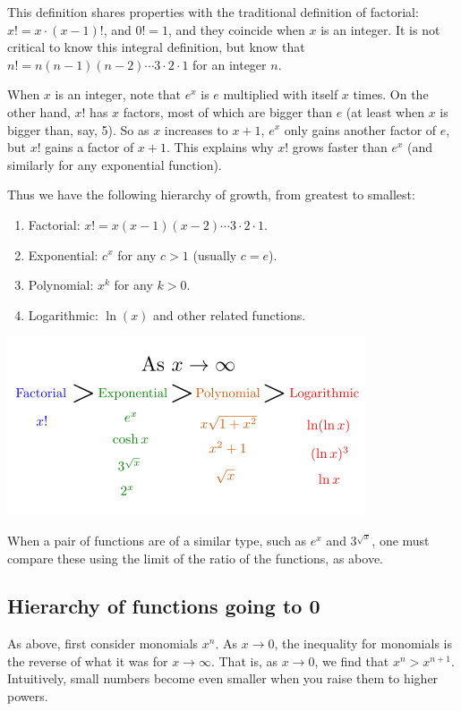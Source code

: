 \documentclass[twoside,openright,titlepage,a4paper]{book}
\begin{document}
\begin{sloppypar}
\begin{examplebox}
This definition shares properties with the traditional definition of factorial: $x! = x \cdot (x-1)!$, and $0! = 1$, and they coincide when $x$ is an integer. It is not critical to know this integral definition, but know that $n! = n(n-1)(n-2)\dotsb 3 \cdot 2 \cdot 1$ for an integer $n$.

When $x$ is an integer, note that $e^x$ is $e$ multiplied with itself $x$ times. On the other hand, $x!$ has $x$ factors, most of which are bigger than $e$ (at least when $x$ is bigger than, say, 5). So as $x$ increases to $x+1$, $e^x$ only gains another factor of $e$, but $x!$ gains a factor of $x+1$. This explains why $x!$ grows faster than $e^x$ (and similarly for any exponential function).
\end{examplebox}

Thus we have the following hierarchy of growth, from greatest to smallest:
\begin{enumerate}
	\item Factorial: $x! = x(x-1)(x-2)\dotsm 3 \cdot 2 \cdot 1$.
	\item Exponential: $c^x$ for any $c>1$ (usually $c=e$).
	\item Polynomial: $x^k$ for any $k>0$.
	\item Logarithmic: $\ln(x)$ and other related functions.
\end{enumerate}

\begin{center}\includegraphics[scale=0.6]{OrdersOfGrowth}\end{center}

When a pair of functions are of a similar type, such as $e^x$ and $3^{\sqrt x}$, one must compare these using the limit of the ratio of the functions, as above.

\subsection{Hierarchy of functions going to 0}
As above, first consider monomials $x^n$. As $x \rightarrow 0$, the inequality for monomials is the reverse of what it was for $x \rightarrow \infty$. That is, as $x \rightarrow 0$, we find that $x^n > x^{n+1}$. Intuitively, small numbers become even smaller when you raise them to higher powers.


\end{sloppypar}
\end{document}

